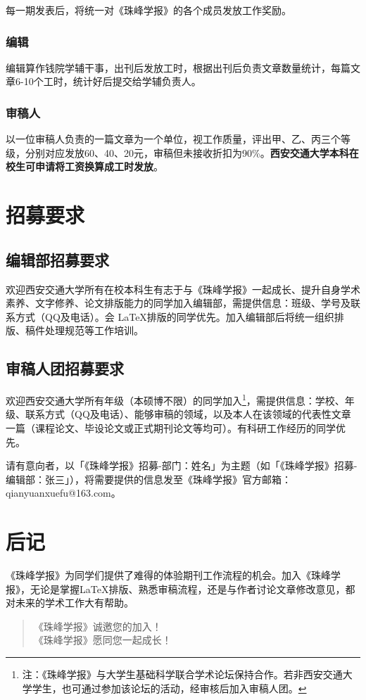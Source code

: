 \documentclass[
decoration,  %
]{qyxf-book}
\begin{document}
\begin{multicols}{2}
    每一期发表后，将统一对《珠峰学报》的各个成员发放工作奖励。
    
    \subsubsection{编辑}
    
    编辑算作钱院学辅干事，出刊后发放工时，根据出刊后负责文章数量统计，每篇文章6-10个工时，统计好后提交给学辅负责人。
    
    \subsubsection{审稿人}
    
    以一位审稿人负责的一篇文章为一个单位，视工作质量，评出甲、乙、丙三个等级，分别对应发放60、40、20元，审稿但未接收折扣为90\%。\textbf{西安交通大学本科在校生可申请将工资换算成工时发放}。
    
    \section*{招募要求}
    
    \subsection*{编辑部招募要求}
    
    欢迎西安交通大学所有在校本科生有志于与《珠峰学报》一起成长、提升自身学术素养、文字修养、论文排版能力的同学加入编辑部，需提供信息：班级、学号及联系方式（QQ及电话）。会 \LaTeX 排版的同学优先。加入编辑部后将统一组织排版、稿件处理规范等工作培训。
    
    \subsection*{审稿人团招募要求}
    
    欢迎西安交通大学所有年级（本硕博不限）的同学加入\footnote{注：《珠峰学报》与大学生基础科学联合学术论坛保持合作。若非西安交通大学学生，也可通过参加该论坛的活动，经审核后加入审稿人团。}，需提供信息：学校、年级、联系方式（QQ及电话）、能够审稿的领域，以及本人在该领域的代表性文章一篇（课程论文、毕设论文或正式期刊论文等均可）。有科研工作经历的同学优先。
    
    请有意向者，以「《珠峰学报》招募-部门：姓名」为主题（如「《珠峰学报》招募-编辑部：张三」），将需要提供的信息发至《珠峰学报》官方邮箱：qianyuanxuefu@163.com。
    
    \section*{后记}
    
    《珠峰学报》为同学们提供了难得的体验期刊工作流程的机会。加入《珠峰学报》，无论是掌握\LaTeX 排版、熟悉审稿流程，还是与作者讨论文章修改意见，都对未来的学术工作大有帮助。
    \begin{quote}
    《珠峰学报》诚邀您的加入！\\
    《珠峰学报》愿同您一起成长！
    \end{quote}

	
\end{multicols}

\newpage
\thispagestyle{empty}
\mbox{}
\newpage

\end{document}
